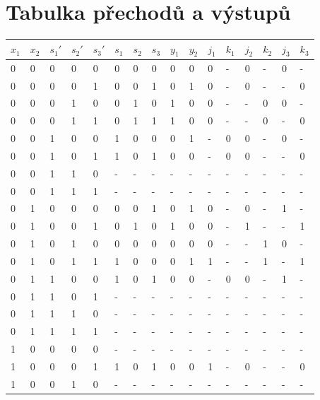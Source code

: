 \documentclass[titlepage]{article}
\begin{document}
\section{Tabulka přechodů a výstupů}
\begin{center}
\begin{tabular}{|l|l|l|l|l|l|l|l|l|l|l|l|l|l|l|l|}
\hline
{\bf $x_1$} & {\bf $x_2$} & {\bf $s_1'$} & {\bf $s_2'$} & {\bf $s_3'$} & {\bf
$s_1$} & {\bf $s_2$} & {\bf $s_3$} & {\bf $y_1$} & {\bf $y_2$} & {\bf $j_1$} & {\bf $k_1$} & {\bf $j_2$} & {\bf $k_2$} & {\bf $j_3$} & {\bf $k_3$}\\
\hline
0 & 0 & 0 & 0 & 0 & 0 & 0 & 0 & 0 & 0 & 0 & - & 0 & - & 0 & - \\
0 & 0 & 0 & 0 & 1 & 0 & 0 & 1 & 0 & 1 & 0 & - & 0 & - & - & 0 \\
0 & 0 & 0 & 1 & 0 & 0 & 1 & 0 & 1 & 0 & 0 & - & - & 0 & 0 & - \\
0 & 0 & 0 & 1 & 1 & 0 & 1 & 1 & 1 & 0 & 0 & - & - & 0 & - & 0 \\
0 & 0 & 1 & 0 & 0 & 1 & 0 & 0 & 0 & 1 & - & 0 & 0 & - & 0 & - \\
0 & 0 & 1 & 0 & 1 & 1 & 0 & 1 & 0 & 0 & - & 0 & 0 & - & - & 0 \\
0 & 0 & 1 & 1 & 0 & - & - & - & - & - & - & - & - & - & - & - \\
0 & 0 & 1 & 1 & 1 & - & - & - & - & - & - & - & - & - & - & - \\
0 & 1 & 0 & 0 & 0 & 0 & 0 & 1 & 0 & 1 & 0 & - & 0 & - & 1 & - \\
0 & 1 & 0 & 0 & 1 & 0 & 1 & 0 & 1 & 0 & 0 & - & 1 & - & - & 1 \\
0 & 1 & 0 & 1 & 0 & 0 & 0 & 0 & 0 & 0 & 0 & - & - & 1 & 0 & - \\
0 & 1 & 0 & 1 & 1 & 1 & 0 & 0 & 0 & 1 & 1 & - & - & 1 & - & 1 \\
0 & 1 & 1 & 0 & 0 & 1 & 0 & 1 & 0 & 0 & - & 0 & 0 & - & 1 & - \\
0 & 1 & 1 & 0 & 1 & - & - & - & - & - & - & - & - & - & - & - \\
0 & 1 & 1 & 1 & 0 & - & - & - & - & - & - & - & - & - & - & - \\
0 & 1 & 1 & 1 & 1 & - & - & - & - & - & - & - & - & - & - & - \\
1 & 0 & 0 & 0 & 0 & - & - & - & - & - & - & - & - & - & - & - \\
1 & 0 & 0 & 0 & 1 & 1 & 0 & 1 & 0 & 0 & 1 & - & 0 & - & - & 0 \\
1 & 0 & 0 & 1 & 0 & - & - & - & - & - & - & - & - & - & - & - \\

\end{tabular}
\end{center}
\end{document}
